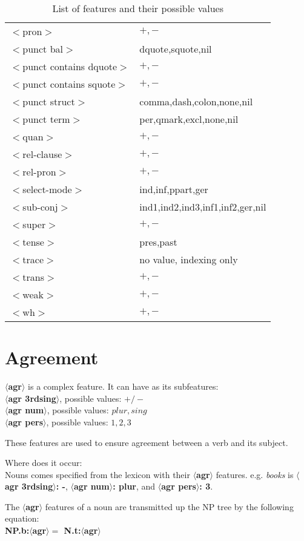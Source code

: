 \begin{table}[hbt]
\begin{tabular}{|l|l|}
$<$pron$>$&$+,-$\\
$<$punct bal$>$&dquote,squote,nil\\
$<$punct contains dquote$>$&$+,-$\\
$<$punct contains squote$>$&$+,-$\\
$<$punct struct$>$&comma,dash,colon,none,nil\\
$<$punct term$>$&per,qmark,excl,none,nil\\
$<$quan$>$&$+,-$\\
$<$rel-clause$>$&$+,-$\\
$<$rel-pron$>$&$+,-$\\
$<$select-mode$>$&ind,inf,ppart,ger\\
$<$sub-conj$>$&ind1,ind2,ind3,inf1,inf2,ger,nil\\
$<$super$>$&$+,-$\\
$<$tense$>$&pres,past\\
$<$trace$>$&no value, indexing only\\
$<$trans$>$&$+,-$\\
$<$weak$>$&$+,-$\\
$<$wh$>$&$+,-$\\
\hline
\end{tabular}
\caption{List of features and their possible values}
\label{feature-table}
\end{table}

\normalsize


\section{Agreement}
{\bf $\langle$agr$\rangle$} is a complex feature.
It can have as its subfeatures:\\
{\bf $\langle$agr 3rdsing$\rangle$}, possible values: {\bf $+/-$ }\\
{\bf $\langle$agr num$\rangle$}, possible values: {\bf $plur,sing$ }\\
{\bf $\langle$agr pers$\rangle$}, possible values: {\bf $1,2,3$ }

These features are used to ensure agreement between a verb and its subject.

Where does it occur:\\
Nouns comes specified from the lexicon with their {\bf $\langle$agr$\rangle$}
features. e.g. {\em books} is {\bf $\langle$agr 3rdsing$\rangle$: -},
{\bf $\langle$agr num$\rangle$: plur}, 
and {\bf $\langle$agr pers$\rangle$: 3}. 

The {\bf $\langle$agr$\rangle$} features of a noun are transmitted up the 
NP tree by the following equation:\\
{\bf NP.b:$\langle$agr$\rangle =$ N.t:$\langle$agr$\rangle$}

